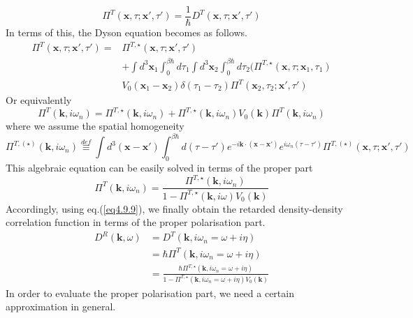 \begin{equation}
\Pi^T(\mathbf x,\tau;\mathbf x',\tau')=\frac{1}{\hbar}D^T(\mathbf x,\tau;\mathbf x',\tau')
\end{equation} 
 In terms of this, the Dyson equation becomes as follows.
\begin{equation}
\begin{aligned}
\Pi^{T}(\mathbf x,\tau;\mathbf x',\tau')=&\Pi^{T,\star}(\mathbf x,\tau;\mathbf x',\tau')\\
&+\int d^3\mathbf x_1 \int_0^{\beta\hbar}d\tau_1\int d^3\mathbf x_2\int _0^{\beta\hbar}d\tau_2(\Pi^{T,\star}(\mathbf x,\tau;\mathbf x_1,\tau_1)\\
&V_0(\mathbf x_1-\mathbf x_2)\delta(\tau_1-\tau_2)\Pi^T(\mathbf x_2,\tau_2;\mathbf x',\tau')
\end{aligned}
\end{equation}
 Or equivalently
\begin{equation}
\Pi^T(\mathbf k,i\omega_n)=\Pi^{T,\star}(\mathbf k,i\omega_n)+\Pi^{T,\star}(\mathbf k,i\omega_n)V_0(\mathbf k)\Pi^T(\mathbf k,i\omega_n)
\end{equation}
 where we assume the spatial homogeneity
\begin{equation}
\Pi^{T,(\star)}(\mathbf k,i\omega_n)\overset{def}{\equiv}\int d^3(\mathbf x-\mathbf x')\int_0^{\beta\hbar} d(\tau-\tau') e^{-i\mathbf k\cdot(\mathbf x-\mathbf x')} e^{i\omega_n(\tau-\tau')} \Pi^{T,(\star)}(\mathbf x,\tau;\mathbf x',\tau')
\end{equation}
 This algebraic equation can be easily solved in terms of the proper part
\begin{equation}
\Pi^T(\mathbf k,i\omega_n)=\frac{\Pi^{T,\star}(\mathbf k,i\omega_n)}{1-\Pi^{T,\star}(\mathbf k,i\omega)V_0(\mathbf k)}
\end{equation}
 Accordingly, using eq.(\ref{eq4.9.9}), we finally obtain the retarded density-density correlation function in terms of the proper polarisation part.
\begin{equation}
\begin{aligned}
D^R(\mathbf k,\omega)&=D^T(\mathbf k,i\omega_n=\omega+i\eta)\\
&=\hbar \Pi^T(\mathbf k,i\omega_n=\omega+i\eta)\\
&=\frac{\hbar \Pi^{T,\star}(\mathbf k,i\omega_n=\omega+i\eta)}{1-\Pi^{T,\star}(\mathbf k,i\omega_n=\omega+i\eta)V_0(\mathbf k)}
\end{aligned}
\end{equation}
In order to evaluate the proper polarisation part, we need a certain approximation in general.\\
